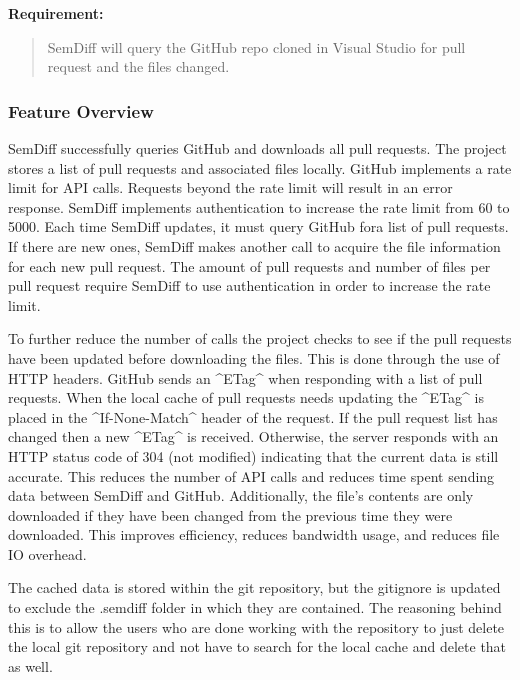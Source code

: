 \documentclass[draftclsnofoot,onecolumn]{IEEEtran}
\begin{document}
\textbf{Requirement:}

\begin{quote}

SemDiff will query the GitHub repo cloned in Visual Studio for pull request and the files changed.

\end{quote}

\subsubsection{Feature Overview}

SemDiff successfully queries GitHub and downloads all pull requests. The project stores a list of pull requests and associated files locally. GitHub implements a rate limit for API calls. Requests beyond the rate limit will result in an error response. SemDiff implements authentication to increase the rate limit from 60 to 5000. Each time SemDiff updates, it must query GitHub fora list of pull requests. If there are new ones, SemDiff makes another call to acquire the file information for each new pull request. The amount of pull requests and number of files per pull request require SemDiff to use authentication in order to increase the rate limit.

To further reduce the number of calls the project checks to see if the pull requests have been updated before downloading the files. This is done through the use of HTTP headers. GitHub sends an ^ETag^ when responding with a list of pull requests. When the local cache of pull requests needs updating the ^ETag^ is placed in the ^If-None-Match^ header of the request. If the pull request list has changed then a new ^ETag^ is received. Otherwise, the server responds with an HTTP status code of 304 (not modified) indicating that the current data is still accurate. This reduces the number of API calls and reduces time spent sending data between SemDiff and GitHub. Additionally, the file's contents are only downloaded if they have been changed from the previous time they were downloaded. This improves efficiency, reduces bandwidth usage, and reduces file IO overhead. 

The cached data is stored within the git repository, but the gitignore is updated to exclude the .semdiff folder in which they are contained. The reasoning behind this is to allow the users who are done working with the repository to just delete the local git repository and not have to search for the local cache and delete that as well. 
\end{document}
